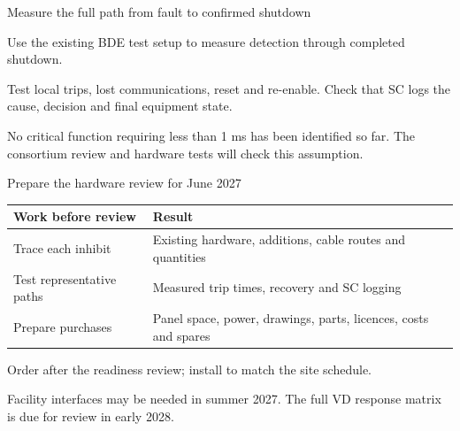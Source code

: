 \documentclass[aspectratio=169,11pt]{beamer}
\begin{document}
\begin{frame}{Measure the full path from fault to confirmed shutdown}
\centering
{}\par\medskip
\raggedright{}\par\medskip
\raggedright

Use the existing BDE test setup to measure detection through completed shutdown.\par\medskip
Test local trips, lost communications, reset and re-enable. Check that SC logs the cause, decision and final equipment state.\par\bigskip
No critical function requiring less than 1 ms has been identified so far. The consortium review and hardware tests will check this assumption.
\end{frame}

\begin{frame}{Prepare the hardware review for June 2027}
\renewcommand{\arraystretch}{1.45}
\begin{tabularx}{\textwidth}{@{}>{\RaggedRight\arraybackslash}p{3.4cm}>{\RaggedRight\arraybackslash}X@{}}
\toprule
\textbf{Work before review} & \textbf{Result}\\\midrule
Trace each inhibit & Existing hardware, additions, cable routes and quantities\\
Test representative paths & Measured trip times, recovery and SC logging\\
Prepare purchases & Panel space, power, drawings, parts, licences, costs and spares\\
\bottomrule
\end{tabularx}\par\bigskip
Order after the readiness review; install to match the site schedule.\par\medskip
Facility interfaces may be needed in summer 2027. The full VD response matrix is due for review in early 2028.
\end{frame}
\end{document}
